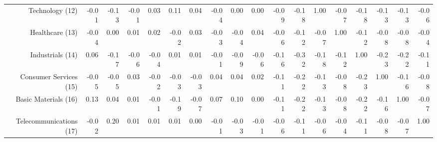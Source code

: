 \begin{sidewaystable}
{\begin{tabular}{rrrrrrrrrrrrrrrrrr}
Technology (12)         & -0.01 & -0.13 & -0.01 & 0.03  & 0.11  & 0.04  & -0.04 & 0.00  & 0.00  & -0.09 & -0.18 & 1.00  & -0.07 & -0.18 & -0.13 & -0.13 & -0.06 \\
Healthcare (13)         & -0.04 & 0.00  & 0.01  & 0.02  & -0.02 & 0.03  & -0.03 & -0.04 & 0.04  & -0.06 & -0.12 & -0.07 & 1.00  & -0.12 & -0.08 & -0.08 & -0.04 \\
Industrials (14)        & 0.06  & -0.17 & -0.06 & -0.04 & 0.01  & 0.01  & -0.01 & -0.09 & -0.06 & -0.16 & -0.32 & -0.18 & -0.12 & 1.00  & -0.23 & -0.22 & -0.11 \\
Consumer Services (15)  & -0.05 & -0.05 & 0.03  & -0.02 & -0.03 & -0.03 & 0.04  & 0.04  & 0.02  & -0.11 & -0.22 & -0.13 & -0.08 & -0.23 & 1.00  & -0.16 & -0.08 \\
Basic Materials (16)    & 0.13  & 0.04  & 0.01  & -0.01 & -0.19 & -0.07 & 0.07  & 0.10  & 0.00  & -0.11 & -0.22 & -0.13 & -0.08 & -0.22 & -0.16 & 1.00  & -0.07 \\
Telecommunications (17) & -0.02 & 0.20  & 0.01  & 0.01  & 0.01  & 0.00  & -0.01 & -0.03 & -0.01 & -0.06 & -0.11 & -0.06 & -0.04 & -0.11 & -0.08 & -0.07 & 1.00 
           \\ 
   \bottomrule
\end{tabular}}
\end{sidewaystable}

